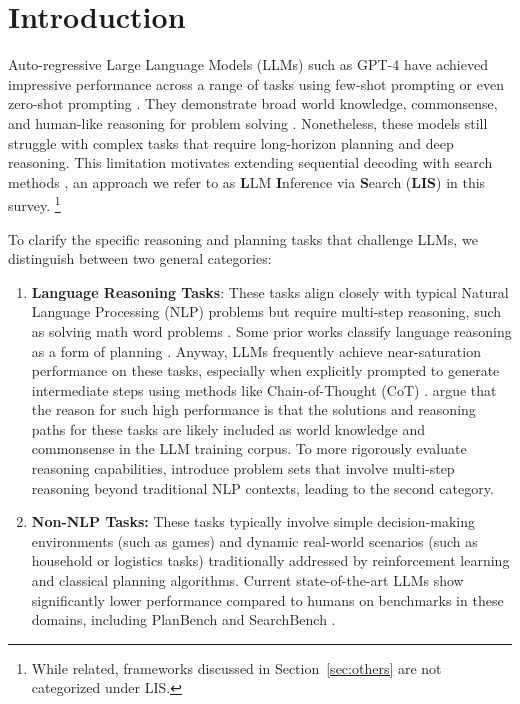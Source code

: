 \section{Introduction}
Auto-regressive Large Language Models (LLMs) such as GPT-4 \citep{achiam2023gpt} have achieved impressive performance across a range of tasks using few-shot prompting \citep{radford2019language,brown2020gpt3} or even zero-shot prompting \citep{kojima2022large}.
They demonstrate broad world knowledge, commonsense, and human-like reasoning for problem solving \citep{santurkar2023whose,wang2022lsat,zhong-etal-2022-analytical,zhong2023agieval}. Nonetheless, these models still struggle with complex tasks that require long-horizon planning and deep reasoning. This limitation motivates extending sequential decoding with search methods \citep{yao2023tree,hao-etal-2023-reasoning}, an approach we refer to as \textbf{L}LM \textbf{I}nference via \textbf{S}earch (\textbf{LIS}) in this survey. \footnote{While related, frameworks discussed in Section~\ref{sec:others} are not categorized under LIS.} 

To clarify the specific reasoning and planning tasks that challenge LLMs, we distinguish between two general categories:
\begin{enumerate}
\item \textbf{Language Reasoning Tasks}:
These tasks align closely with typical Natural Language Processing (NLP) problems but require multi-step reasoning, such as solving math word problems \citep{cobbe2021gsm8k}. Some prior works classify language reasoning as a form of planning \citep{huang2024understanding}. Anyway, LLMs frequently achieve near-saturation performance on these tasks, especially when explicitly prompted to generate intermediate steps using methods like Chain-of-Thought (CoT) \citep{wei2022chain}. \citet{valmeekam2023planbench} argue that the reason for such high performance is that the solutions and reasoning paths for these tasks are likely included as world knowledge and commonsense in the LLM training corpus. To more rigorously evaluate reasoning capabilities, \citet{valmeekam2023planbench} introduce problem sets that involve multi-step reasoning beyond traditional NLP contexts, leading to the second category.

\item \textbf{Non-NLP Tasks:}
These tasks typically involve simple decision-making environments (such as games) and dynamic real-world scenarios (such as household or logistics tasks) traditionally addressed by reinforcement learning and classical planning algorithms. Current state-of-the-art LLMs show significantly lower performance compared to humans on benchmarks in these domains, including PlanBench \citep{valmeekam2023planbench,valmeekam2023on} and SearchBench \citep{borazjanizadeh2024navigating}.
\end{enumerate}


